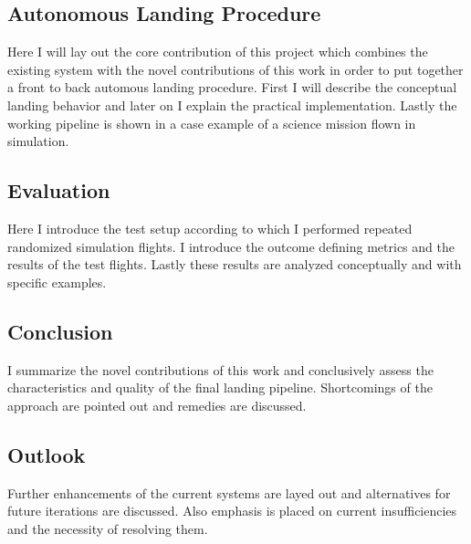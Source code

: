 \subsection{Autonomous Landing Procedure}
Here I will lay out the core contribution of this project which combines the existing system with the novel contributions of this work in order to put together a front to back automous landing procedure. First I will describe the conceptual landing behavior and later on I explain the practical implementation. Lastly the working pipeline is shown in a case example of a science mission flown in simulation.
\subsection{Evaluation}
Here I introduce the test setup according to which I performed repeated randomized simulation flights. I introduce the outcome defining metrics and the results of the test flights. Lastly these results are analyzed conceptually and with specific examples. %
\subsection{Conclusion}
I summarize the novel contributions of this work and conclusively assess the characteristics and quality of the final landing pipeline. Shortcomings of the approach are pointed out and remedies are discussed.
\subsection{Outlook}
Further enhancements of the current systems are layed out and alternatives for future iterations are discussed. Also emphasis is placed on current insufficiencies and the necessity of resolving them.